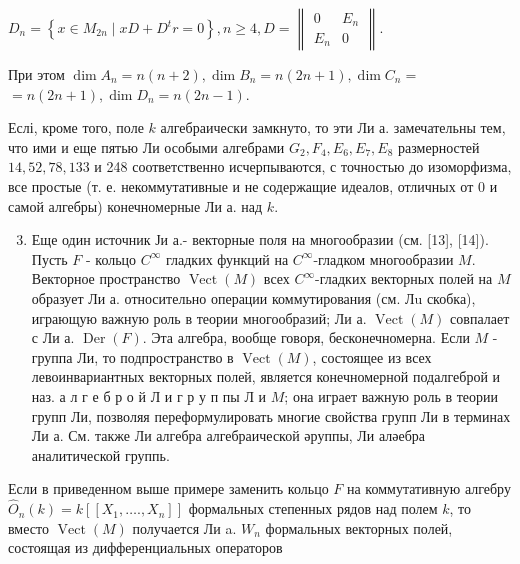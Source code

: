 \documentclass[10pt]{article}
\begin{document}
$D_{n}=\left\{x \in M_{2 n} \mid x D+D^{t} r=0\right\}, n \geqslant 4, D=\left\|\begin{array}{ll}0 & E_{n} \\ E_{n} & 0\end{array}\right\|$.



При этом $\operatorname{dim} A_{n}=n(n+2), \operatorname{dim} B_{n}=n(2 n+1), \operatorname{dim} C_{n}=$ $=n(2 n+1), \operatorname{dim} D_{n}=n(2 n-1)$.



Еслі, кроме того, поле $k$ алгебраически замкнуто, то эти Ли а. замечательны тем, что ими и еще пятью Ли особыми алгебрами $G_{2}, F_{4}, E_{6}, E_{7}, E_{8}$ размерностей $14,52,78,133$ и 248 соответственно исчерпываются, с точностью до изоморфизма, все простые (т. е. некоммутативные и не содержащие идеалов, отличных от 0 и самой алгебры) конечномерные Ли а. над $k$.



\begin{enumerate}

  \setcounter{enumi}{2}

  \item Еще один источник Ји а.- векторные поля на многообразии (см. [13], [14]). Пусть $F$ - кольцо $C^{\infty}$ гладких функций на $C^{\infty}$-гладком многообразии $M$. Векторное пространство $\operatorname{Vect}(M)$ всех $C^{\infty}$-гладких векторных полей на $M$ образует Ли а. относительно операции коммутирования (см. Лu скобка), играющую важную роль в теории многообразий; Ли а. $\operatorname{Vect}(M)$ совпалает с Ли а. $\operatorname{Der}(F)$. Эта алгебра, вообще говоря, бесконечномерна. Если $M$ - группа Ли, то подпространство в $\operatorname{Vect}(M)$, состоящее из всех левоинвариантных векторных полей, является конечномерной подалгеброй и наз. а л г е б р о й Л и г р у п пы Л и $M$; она играет важную роль в теории групп Ли, позволяя переформулировать многие свойства групп Ли в терминах Ли а. См. также Ли алгебра алгебраической әруппы, Ли аләебра аналитической группь.

\end{enumerate}



Если в приведенном выше примере заменить кольцо $F$ на коммутативную алгебру $\widehat{O}_{n}(k)=k\left[\left[X_{1}, \ldots ., X_{n}\right]\right]$ формальных степенных рядов над полем $k$, то вместо $\operatorname{Vect}(M)$ получается Ли a. $W_{n}$ формальных векторных полей, состоящая из дифференциальных операторов
\end{document}
